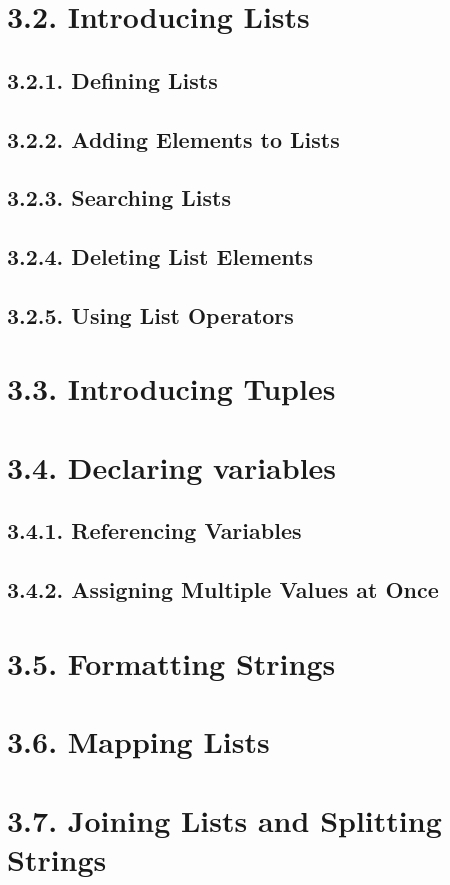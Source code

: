\documentclass[oneside,12pt]{book}
\begin{document}
\section{3.2. Introducing Lists}
\subsection{3.2.1. Defining Lists}
\subsection{3.2.2. Adding Elements to Lists}
\subsection{3.2.3. Searching Lists}
\subsection{3.2.4. Deleting List Elements}
\subsection{3.2.5. Using List Operators}
       
\section{3.3. Introducing Tuples}
\section{3.4. Declaring variables}
\subsection{3.4.1. Referencing Variables}
\subsection{3.4.2. Assigning Multiple Values at Once}
       
\section{3.5. Formatting Strings}
\section{3.6. Mapping Lists}
\section{3.7. Joining Lists and Splitting Strings}
\end{document}
